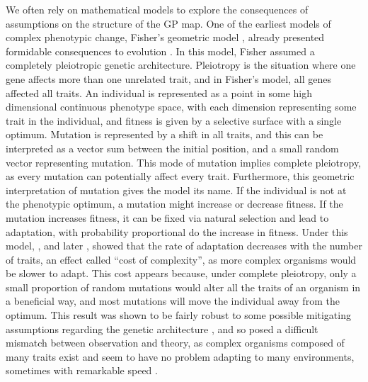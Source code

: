 \begin{refsection}
We often rely on mathematical models to explore the consequences of
assumptions on the structure of the GP map. One of the earliest models
of complex phenotypic change, Fisher's geometric model
\parencite{Fisher1930-bp}, already presented formidable consequences to
evolution \parencite{Orr2000-gn}. In this model, Fisher assumed a completely
pleiotropic genetic architecture. Pleiotropy is the situation where one gene affects more than one
unrelated trait, and in Fisher's model, all genes affected all traits.
An individual is represented as a point in some high dimensional
continuous phenotype space, with each dimension representing some trait
in the individual, and fitness is given by a selective surface with a
single optimum. Mutation is represented by a shift in all traits, and
this can be interpreted as a vector sum between the initial position,
and a small random vector representing mutation. This mode of mutation
implies complete pleiotropy, as every mutation can potentially affect
every trait. Furthermore, this geometric interpretation of mutation
gives the model its name. If the individual is not at the phenotypic
optimum, a mutation might increase or decrease fitness. If the mutation
increases fitness, it can be fixed via natural selection and lead to
adaptation, with probability proportional do the increase in fitness.
Under this model, \textcite{Kimura1983-qs}, and later 
\textcite{Orr2000-gn}, showed that the rate of adaptation decreases with
the number of traits, an effect called ``cost of complexity'', as more complex organisms would be
slower to adapt. This cost appears because, under complete pleiotropy,
only a small proportion of random mutations would alter all the traits
of an organism in a beneficial way, and most mutations will move the
individual away from the optimum. This result was shown to be fairly
robust to some possible mitigating assumptions regarding the genetic
architecture \parencite{Welch2003-mh}, and so posed a difficult mismatch
between observation and theory, as complex organisms composed of many
traits exist and seem to have no problem adapting to many environments,
sometimes with remarkable speed \parencite{Kinnison2001-lu}.


\end{refsection}
